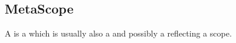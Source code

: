 \subsection{MetaScope}
\label{concept-MetaScope}

A  is a  which is usually also a 
and possibly a  reflecting a scope.



